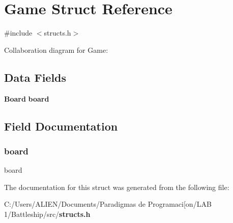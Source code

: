 \section{Game Struct Reference}
\label{struct_game}


{\ttfamily \#include $<$structs.\+h$>$}



Collaboration diagram for Game\+:
\subsection*{Data Fields}
\begin{DoxyCompactItemize}
\item 
{\bf Board} {\bf board}
\end{DoxyCompactItemize}


\subsection{Field Documentation}
\label{struct_game_aa82ec2ef46b7f2f6b838b07403015cee} 
\subsubsection{board}
{\footnotesize{} board}



The documentation for this struct was generated from the following file\+:\begin{DoxyCompactItemize}
\item 
C\+:/\+Users/\+A\+L\+I\+E\+N/\+Documents/\+Paradigmas de Programaci[on/\+L\+A\+B 1/\+Battleship/src/{\bf structs.\+h}\end{DoxyCompactItemize}
